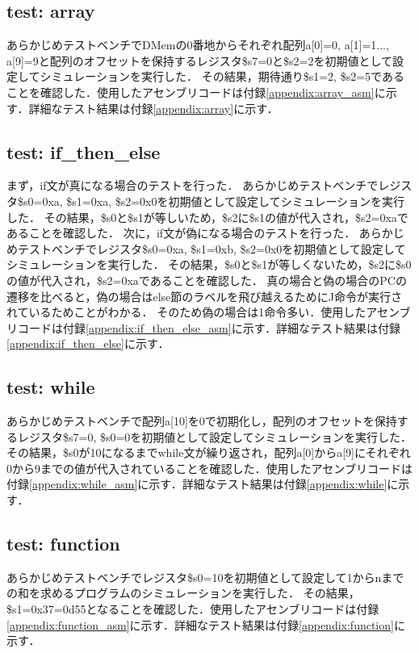 \documentclass[dvipdfmx]{jsarticle}
\begin{document}
\subsection{test: array}
あらかじめテストベンチでDMemの0番地からそれぞれ配列a[0]=0, a[1]=1..., a[9]=9と配列のオフセットを保持するレジスタ\$s7=0と\$s2=2を初期値として設定してシミュレーションを実行した．
その結果，期待通り\$s1=2, \$s2=5であることを確認した．使用したアセンブリコードは付録\ref{appendix:array_asm}に示す．詳細なテスト結果は付録\ref{appendix:array}に示す．

\subsection{test: if\_then\_else}
まず，if文が真になる場合のテストを行った．
あらかじめテストベンチでレジスタ\$s0=0xa, \$s1=0xa, \$s2=0x0を初期値として設定してシミュレーションを実行した．
その結果，\$s0と\$s1が等しいため，\$s2に\$s1の値が代入され，\$s2=0xaであることを確認した．
次に，if文が偽になる場合のテストを行った．
あらかじめテストベンチでレジスタ\$s0=0xa, \$s1=0xb, \$s2=0x0を初期値として設定してシミュレーションを実行した．
その結果，\$s0と\$s1が等しくないため，\$s2に\$s0の値が代入され，\$s2=0xaであることを確認した．
真の場合と偽の場合のPCの遷移を比べると，偽の場合はelse節のラベルを飛び越えるためにJ命令が実行されているためことがわかる．
そのため偽の場合は1命令多い．使用したアセンブリコードは付録\ref{appendix:if_then_else_asm}に示す．詳細なテスト結果は付録\ref{appendix:if_then_else}に示す．

\subsection{test: while}
あらかじめテストベンチで配列a[10]を0で初期化し，配列のオフセットを保持するレジスタ\$s7=0, \$s0=0を初期値として設定してシミュレーションを実行した．
その結果，\$s0が10になるまでwhile文が繰り返され，配列a[0]からa[9]にそれぞれ0から9までの値が代入されていることを確認した．使用したアセンブリコードは付録\ref{appendix:while_asm}に示す．詳細なテスト結果は付録\ref{appendix:while}に示す．

\subsection{test: function}
\label{sec:function}
あらかじめテストベンチでレジスタ\$s0=10を初期値として設定して1からnまでの和を求めるプログラムのシミュレーションを実行した．
その結果，\$s1=0x37=0d55となることを確認した．使用したアセンブリコードは付録\ref{appendix:function_asm}に示す．詳細なテスト結果は付録\ref{appendix:function}に示す．
\end{document}

